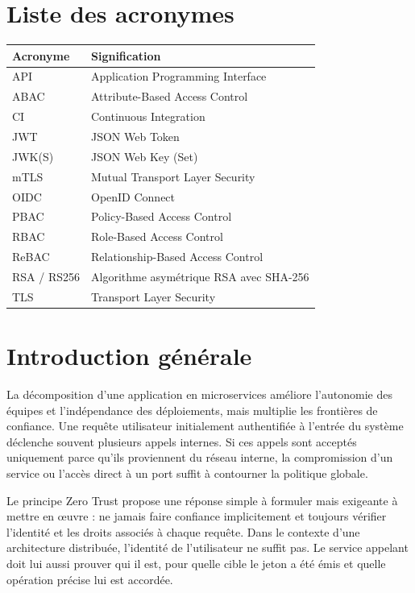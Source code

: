 \documentclass[12pt,a4paper,oneside]{report}
\begin{document}
\chapter*{Liste des acronymes}
\begin{longtable}{P{2.5cm}P{11.5cm}}
\toprule
\textbf{Acronyme} & \textbf{Signification} \\
\midrule
API & Application Programming Interface \\
ABAC & Attribute-Based Access Control \\
CI & Continuous Integration \\
JWT & JSON Web Token \\
JWK(S) & JSON Web Key (Set) \\
mTLS & Mutual Transport Layer Security \\
OIDC & OpenID Connect \\
PBAC & Policy-Based Access Control \\
RBAC & Role-Based Access Control \\
ReBAC & Relationship-Based Access Control \\
RSA / RS256 & Algorithme asymétrique RSA avec SHA-256 \\
TLS & Transport Layer Security \\
\bottomrule
\end{longtable}

\tableofcontents
\listoffigures
\listoftables
\clearpage
{}

\chapter*{Introduction générale}
La décomposition d'une application en microservices améliore l'autonomie des
équipes et l'indépendance des déploiements, mais multiplie les frontières de
confiance. Une requête utilisateur initialement authentifiée à l'entrée du
système déclenche souvent plusieurs appels internes. Si ces appels sont acceptés
uniquement parce qu'ils proviennent du réseau interne, la compromission d'un
service ou l'accès direct à un port suffit à contourner la politique globale.

Le principe Zero Trust propose une réponse simple à formuler mais exigeante à
mettre en œuvre : ne jamais faire confiance implicitement et toujours vérifier
l'identité et les droits associés à chaque requête. Dans le contexte d'une
architecture distribuée, l'identité de l'utilisateur ne suffit pas. Le service
appelant doit lui aussi prouver qui il est, pour quelle cible le jeton a été émis
et quelle opération précise lui est accordée.
\end{document}
